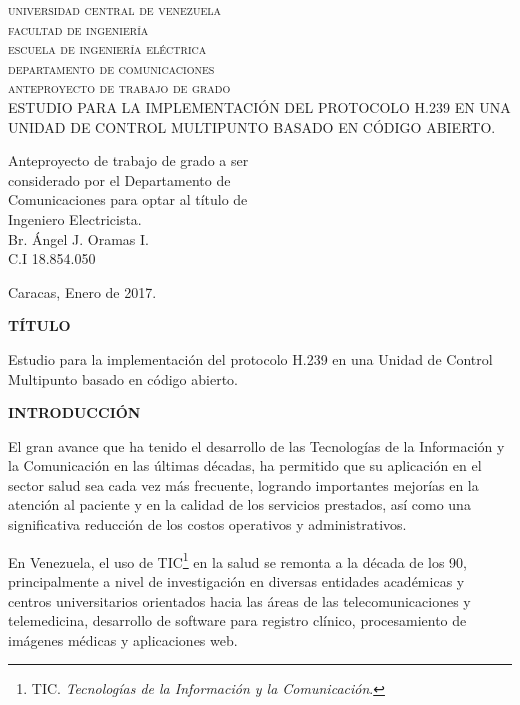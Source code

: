 \documentclass[12pt,letterpaper]{article}
\begin{document}
		

\begin{titlepage}	
\begin{center}
\textsc{universidad central de venezuela\\facultad de ingeniería\\escuela de ingeniería eléctrica\\departamento de comunicaciones\\anteproyecto de trabajo de grado\\}
\vspace*{5cm}
ESTUDIO PARA LA IMPLEMENTACIÓN DEL PROTOCOLO H.239 EN UNA UNIDAD DE CONTROL MULTIPUNTO BASADO EN CÓDIGO ABIERTO.
\end{center}
\vspace*{4cm}

\begin{flushright}
{\footnotesize Anteproyecto de trabajo de grado a ser\\considerado por el Departamento de\\Comunicaciones para optar al título de\\Ingeniero Electricista.}\\
\vspace*{1cm}Br. Ángel J. Oramas I.\\C.I 18.854.050
\end{flushright}

\vfill \centerline {Caracas, Enero de 2017.}	
\end{titlepage}

\newpage
\centerline{\textbf{TÍTULO}}

Estudio para la implementación del protocolo H.239 en una Unidad de Control Multipunto basado en código abierto.

\centerline{\textbf{INTRODUCCIÓN}}

El gran avance que ha tenido el desarrollo de las Tecnologías de la Información y la Comunicación en las últimas décadas, ha permitido que su aplicación en el sector salud sea cada vez más frecuente, logrando importantes mejorías en la atención al paciente y en la calidad de los servicios prestados, así como una significativa reducción de los costos  operativos y administrativos.

En Venezuela, el uso de TIC\footnote{TIC. \emph{Tecnologías de la Información y la Comunicación}.} en la salud se remonta a la década de los 90, principalmente a nivel de investigación en diversas entidades académicas y centros universitarios orientados hacia las  áreas de las telecomunicaciones y telemedicina, desarrollo de software para registro clínico, procesamiento de imágenes médicas y aplicaciones web.
\end{document}
